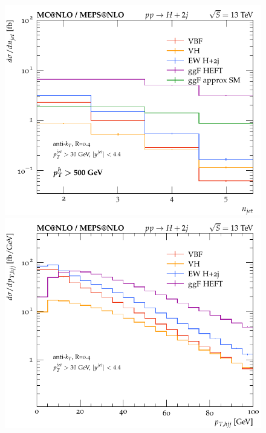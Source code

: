 \documentclass[10pt,prd,fleqn,superscriptaddress,notitlepage,nofootinbib,preprintnumbers,nobalancelastpage]{revtex4-1}
\begin{document}
\begin{figure}[p]
\begin{minipage}{.45\textwidth}
    \includegraphics[width=\textwidth]{figures/channels/njets_pth500.pdf}
  \end{minipage}\hfill
  \begin{minipage}{.45\textwidth}
    \includegraphics[width=\textwidth]{figures/channels/pthjj12.pdf}

\end{minipage}
\end{figure}
\end{document}

